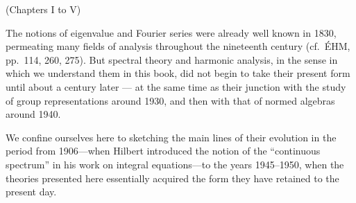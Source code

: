 
(Chapters I to V)

The notions of eigenvalue and Fourier series were already well known in 1830, permeating many fields of analysis throughout the nineteenth century (cf.~ÉHM, pp.~114, 260, 275). But spectral theory and harmonic analysis, in the sense in which we understand them in this book, did not begin to take their present form until about a century later --- at the same time as their junction with the study of group representations around 1930, and then with that of normed algebras around 1940.

We confine ourselves here to sketching the main lines of their evolution in the period from 1906—when Hilbert introduced the notion of the “continuous spectrum” in his work on integral equations—to the years 1945–1950, when the theories presented here essentially acquired the form they have retained to the present day.

